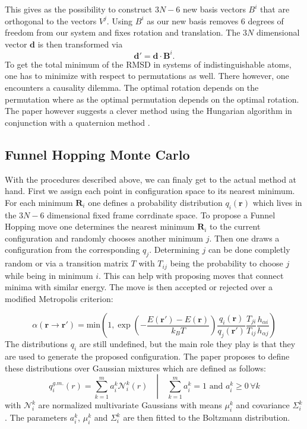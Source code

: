 \documentclass[11pt]{scrartcl} %
\begin{document}
This gives as the possibility to construct $3N-6$ new basis vectors $B^i$ that are orthogonal to the vectors $V^j$. Using $B^i$ as our new basis removes 6 degrees of freedom from our system and fixes rotation and translation. The $3N$ dimensional vector $\mathbf{d}$ is then transformed via
\begin{equation}
	\mathbf{d}'=\mathbf{d}\cdot\mathbf{B}^i.
\end{equation}
To get the total minimum of the RMSD in systems of indistinguishable atoms, one has to minimize with respect to permutations as well. There however, one encounters a causality dilemma. The optimal rotation depends on the permutation where as the optimal permutation depends on the optimal rotation. The paper however suggests a clever method using the Hungarian algorithm \cite{Kuhn1955} in conjunction with a quaternion method \cite{Coutsias2004}.
\subsection{Funnel Hopping Monte Carlo}
With the procedures described above, we can finaly get to the actual method at hand. First we assign each point in configuration space to its nearest minimum. For each minimum $\mathbf{R}_i$ one defines a probability distribution $q_i(\mathbf{r})$ which lives in the $3N-6$ dimensional fixed frame corrdinate space. To propose a Funnel Hopping move one determines the nearest minimum $\mathbf{R}_i$ to the current configuration and randomly chooses another minimum $j$. Then one draws a configuration from the corresponding $q_j$. Determining $j$ can be done completly random or via a transition matrix $T$ with $T_{ij}$ being the probability to choose $j$ while being in minimum $i$. This can help with proposing moves that connect minima with similar energy. The move is then accepted or rejected over a modified Metropolis criterion:

\begin{equation}
	\alpha(\mathbf{r}\rightarrow\mathbf{r}')=\text{min}\left(1,\exp\left(-\frac{E(\mathbf{r}')-E(\mathbf{r})}{k_BT}\right)\frac{q_i(\mathbf{r})}{q_j(\mathbf{r}')}\frac{T_{ji}}{T_{ij}}\frac{h_{\alpha i}}{h_{\alpha j}}\right)	
\end{equation}
The distributions $q_i$ are still undefined, but the main role they play is that they are used to generate the proposed configuration. The paper proposes to define these distributions over Gaussian mixtures which are defined as follows:
\begin{equation}
	q_i^{g.m.}(r)=\left.\sum_{k=1}^m a_i^k \mathcal{N}_i^k(r) \quad\right|\quad \sum_{k=1}^m a_i^k=1\text{ and } a_i^k \geq0\,\forall k
\end{equation}
with $\mathcal{N}_i^k$ are normalized multivariate Gaussians with means $\mu^k_i$ and covariance $\Sigma_i^k$. The parameters $a_i^k$, $\mu_i^k$ and $\Sigma_i^k$ are then fitted to the Boltzmann distribution.


\newpage
\printbibliography[heading=bibintoc]
\end{document}
